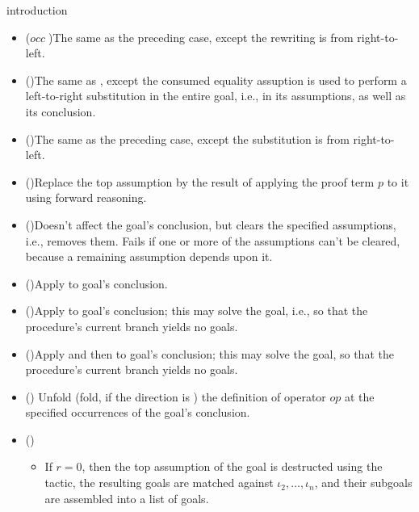 \begin{tactic}[$\tau$=>$\;\iota_1 \cdots \iota_n$]{introduction}
\begin{tsyntax}[empty]{}
\begin{itemize}
    \item ($\mathit{occ}\;$\ec{<-})\quad The same as the preceding case,
      except the rewriting is from right-to-left.

    \item (\ec{->>})\quad The same as \ec{->}, except the consumed
      equality assuption is used to perform a left-to-right substitution
      in the entire goal, i.e., in its assumptions, as well as its
      conclusion.

    \item (\ec{<<-})\quad The same as the preceding case, except
      the substitution is from right-to-left.

    \item ()\quad Replace the top assumption by the result
    of applying the proof term $p$ to it using forward reasoning.

    \item ()\quad Doesn't affect the goal's
      conclusion, but clears the specified assumptions, i.e., removes
      them. Fails if one or more of the assumptions can't be cleared,
      because a remaining assumption depends upon it.

    \item (\ec{/=})\quad Apply  to goal's conclusion.

    \item (\ec{//})\quad Apply  to goal's conclusion;
      this may solve the goal, i.e., so that the procedure's current
      branch yields no goals.

    \item (\ec{/=})\quad Apply  and then 
      to goal's conclusion; this may solve the goal, so that the
      procedure's current branch yields no goals.

    \item ({})\quad
      Unfold (fold, if the direction is \ec{-}) the definition of
      operator $\mathit{op}$ at the specified occurrences of the
      goal's conclusion.

    \item ()\quad
      \begin{itemize}
      \item If $r=0$, then the top assumption of the goal is destructed
        using the  tactic, the resulting goals are
        matched against $\iota_2,\ldots,\iota_n$, and their subgoals
        are assembled into a list of goals.


\end{itemize}
\end{itemize}
\end{tsyntax}
\end{tactic}
